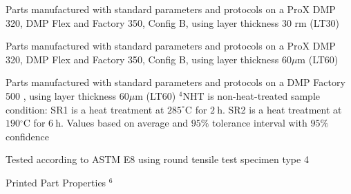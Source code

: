 \documentclass[10pt]{article}
\begin{document}
Parts manufactured with standard parameters and protocols on a ProX DMP 320, DMP Flex and Factory 350, Config B, using layer thickness 30 rm (LT30)

Parts manufactured with standard parameters and protocols on a ProX DMP 320, DMP Flex and Factory 350, Config B, using layer thickness $60 \mu \mathrm{m}$ (LT60)

Parts manufactured with standard parameters and protocols on a DMP Factory 500 , using layer thickness $60 \mu \mathrm{m}$ (LT60) ${ }^{4} \mathrm{NHT}$ is non-heat-treated sample condition: SR1 is a heat treatment at $285^{\circ} \mathrm{C}$ for $2 \mathrm{~h}$. SR2 is a heat treatment at $190{ }^{\circ} \mathrm{C}$ for $6 \mathrm{~h}$. Values based on average and $95 \%$ tolerance interval with $95 \%$ confidence

Tested according to ASTM E8 using round tensile test specimen type 4

Printed Part Properties ${ }^{6}$
\end{document}
